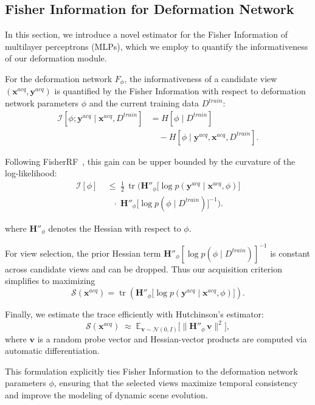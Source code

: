 \subsection{Fisher Information for Deformation Network}
In this section, we introduce a novel estimator for the Fisher Information of multilayer perceptrons (MLPs), which we employ to quantify the informativeness of our deformation module.

For the deformation network \(F_{\phi}\), the informativeness of a candidate view \((\mathbf{x}^{acq}, \mathbf{y}^{acq})\) is quantified by the Fisher Information with respect to deformation network parameters \(\phi\) and the current training data \(D^{train}\):
\begin{align}
\mathcal{I}[\phi ; \mathbf{y}^{acq} \mid \mathbf{x}^{acq}, D^{train}] 
&= H[\phi \mid D^{train}] \nonumber \\
&\quad - H[\phi \mid \mathbf{y}^{acq}, \mathbf{x}^{acq}, D^{train}].
\end{align}


Following FisherRF~\cite{fisherrf}, this gain can be upper bounded by the curvature of the log-likelihood:
\begin{align}
\mathcal{I}[\phi] 
&\;\le\; \tfrac{1}{2}\,\operatorname{tr} \Big(
    \mathbf{H}''_{\phi}\big[ \log p(\mathbf{y}^{acq} \mid \mathbf{x}^{acq}, \phi) \big] 
    \nonumber \\
&\quad \cdot \;
    \mathbf{H}''_{\phi}\big[ \log p(\phi \mid D^{train}) \big]^{-1}
\Big).
\end{align}

where \(\mathbf{H}''_{\phi}\) denotes the Hessian with respect to \(\phi\).

For view selection, the prior Hessian term \(\mathbf{H}''_{\phi}[\log p(\phi \mid D^{train})]^{-1}\) is constant across candidate views and can be dropped. Thus our acquisition criterion simplifies to maximizing
\[
\mathcal{S}(\mathbf{x}^{acq}) 
= \operatorname{tr}\!\left( \mathbf{H}''_{\phi}\big[ \log p(\mathbf{y}^{acq} \mid \mathbf{x}^{acq}, \phi) \big] \right).
\]

Finally, we estimate the trace efficiently with Hutchinson’s estimator:
\[
\mathcal{S}(\mathbf{x}^{acq}) 
\;\approx\; \mathbb{E}_{\mathbf{v} \sim \mathcal{N}(0, I)} \big[ \| \mathbf{H}''_{\phi}\, \mathbf{v} \|^2 \big],
\]
where \(\mathbf{v}\) is a random probe vector and Hessian-vector products are computed via automatic differentiation.

This formulation explicitly ties Fisher Information to the deformation network parameters \(\phi\), ensuring that the selected views maximize temporal consistency and improve the modeling of dynamic scene evolution.





